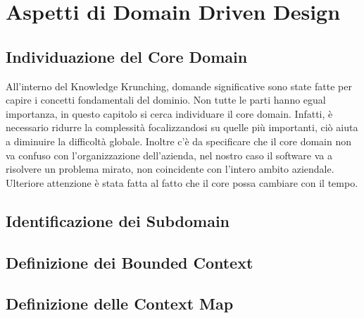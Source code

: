 \chapter{Aspetti di Domain Driven Design}
    \section{Individuazione del Core Domain}
	All'interno del Knowledge Krunching, domande significative sono state fatte per capire i concetti fondamentali del dominio.
	Non tutte le parti hanno egual importanza, in questo capitolo si cerca individuare il core domain. Infatti, è necessario ridurre la complessità focalizzandosi su quelle più importanti, ciò aiuta a diminuire la difficoltà globale.
	Inoltre c'è da specificare che il core domain non va confuso con l’organizzazione dell'azienda, nel nostro caso il software va a risolvere un problema mirato, non coincidente con l'intero ambito aziendale.
	Ulteriore attenzione è stata fatta al fatto che il core possa cambiare con il tempo. 
    \section{Identificazione dei Subdomain}
    \section{Definizione dei Bounded Context}
    \section{Definizione delle Context Map}